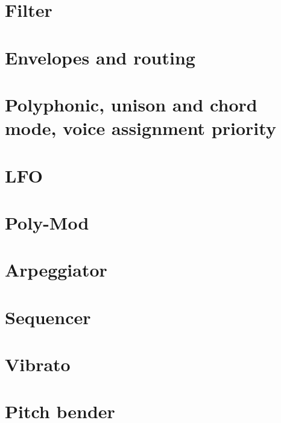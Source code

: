 \documentclass[draft,landscape, 11pt, oneside]{report}
\newenvironment{flowtext}{\addmargin[0cm]{7cm}}{\endaddmargin} %
\begin{document}
\begin{flowtext}
\section{Filter}\label{filter}



\section{Envelopes and routing}\label{envelopes}



\section{Polyphonic, unison and chord mode, voice assignment priority}\label{poly-unison-voice}



\section{LFO}\label{lfo}



\section{Poly-Mod}\label{polymod}



\section{Arpeggiator}\label{arp}



\section{Sequencer}\label{seq}



\section{Vibrato}\label{vib}



\section{Pitch bender}\label{pitchbend}


\end{flowtext}
\end{document}
